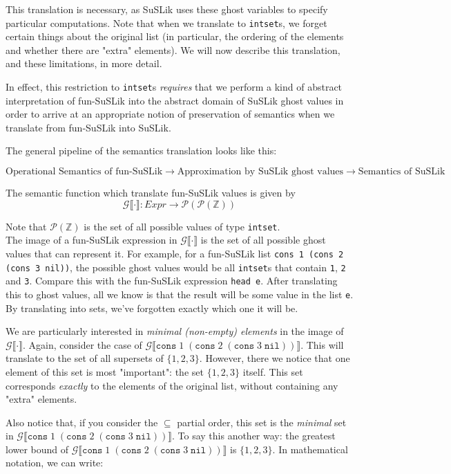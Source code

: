 \documentclass[10pt]{article}
\newcommand{\ttt}[1]{\texttt{#1}}
\newcommand{\ra}{\ensuremath{\rightarrow}}
\newcommand{\cons}{\ttt{cons}}
\newcommand{\nil}{\ttt{nil}}
\newcommand{\sem} [1] {\llbracket#1\rrbracket}
\newcommand{\Gsem} [1] {\mathcal{G}\sem{#1}}
\begin{document}
\noindent
This translation is necessary, as SuSLik uses these ghost variables to specify particular computations. Note that when we translate to
\verb|intset|s, we forget certain things about the original list (in particular, the ordering of the elements and whether there are "extra"
elements). We will now describe this translation, and these limitations, in more detail.

In effect, this restriction to \verb|intset|s \textit{requires} that we perform a kind of abstract interpretation of fun-SuSLik into the
abstract domain of SuSLik ghost values in order to arrive at an appropriate notion of preservation of semantics when we
translate from fun-SuSLik into SuSLik.


\noindent
The general pipeline of the semantics translation looks like this:

\[
  {\scriptstyle \text{Operational Semantics of fun-SuSLik} \ra \text{Approximation by SuSLik ghost values} \ra \text{Semantics of SuSLik}}
\]

\noindent
The semantic function which translate fun-SuSLik values is given by
\[
  \Gsem{\cdot} : Expr \ra \mathcal{P}(\mathcal{P}(\mathbb{Z}))
\]

\noindent
Note that $\mathcal{P}(\mathbb{Z})$ is the set of all possible values of type \verb|intset|.\\

The image of a fun-SuSLik expression in $\Gsem{\cdot}$ is the
set of all possible ghost values that can represent it. For example, for a fun-SuSLik list \verb|cons 1 (cons 2 (cons 3 nil))|, the possible
ghost values would be all \verb|intset|s that contain \ttt{1}, \ttt{2} and \ttt{3}. Compare this with the fun-SuSLik expression
\verb|head e|. After translating this to ghost values, all we know is that the result will be some value in the
list \verb|e|. By translating into sets, we've forgotten exactly which one it will be.

We are particularly interested in \textit{minimal (non-empty) elements} in the image of
$\Gsem{\cdot}$. Again, consider the case of $\Gsem{\cons\; 1\; (\cons\; 2\; (\cons\; 3\; \nil))}$.
This will translate to the set of all supersets of $\{1,2,3\}$. However, there we notice that one
element of this set is most "important": the set $\{1,2,3\}$ itself. This set corresponds
\textit{exactly} to the elements of the original list, without containing any
"extra" elements.

Also notice that, if you consider the $\subseteq$ partial order,
this set is the \textit{minimal} set in $\Gsem{\cons\; 1\; (\cons\; 2\; (\cons\; 3\; \nil))}$. To say this another way:
the greatest lower bound of $\Gsem{\cons\; 1\; (\cons\; 2\; (\cons\; 3\; \nil))}$ is $\{1,2,3\}$. In mathematical notation,
we can write:
\end{document}
